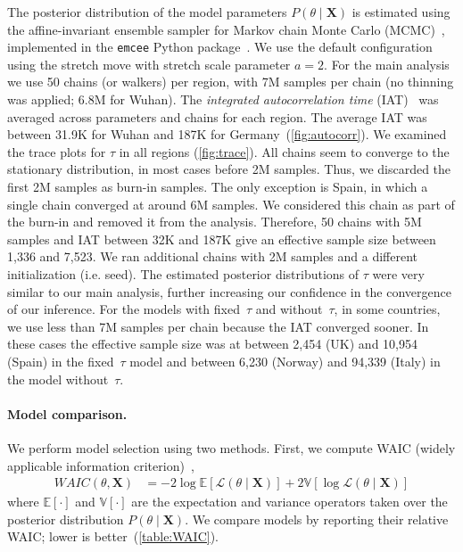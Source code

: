 \documentclass[12pt]{extarticle}
\let\vec\mathbf
\begin{document}
{The posterior distribution of the model parameters $P(\theta \mid \vec{X})$ is estimated using the affine-invariant ensemble sampler for Markov chain Monte Carlo (MCMC)~\citep{Goodman2010}, implemented in the \texttt{emcee} Python package~\citep{Foreman-Mackey2013}.
We use the default configuration using the stretch move with stretch scale parameter $a=2$.
For the main analysis we use 50 chains (or walkers) per region, with 7M samples per chain (no thinning was applied; 6.8M for Wuhan).
The \emph{integrated autocorrelation time} (IAT)~\citep{Foreman-Mackey2013,Goodman2010} was averaged across parameters and chains for each region. 
The average IAT was between 31.9K for Wuhan and 187K for Germany~(\autoref{fig:autocorr}).
We examined the trace plots for $\tau$ in all regions (\autoref{fig:trace}).
All chains seem to converge to the stationary distribution, in most cases before 2M samples. Thus, we discarded the first 2M samples as burn-in samples.
The only exception is Spain, in which a single chain converged at around 6M samples.
We considered this chain as part of the burn-in and removed it from the analysis.
Therefore, 50 chains with 5M samples and IAT between 32K and 187K give an effective sample size between 1,336 and 7,523.
We ran additional chains with 2M samples and a different initialization (i.e. seed). The estimated posterior distributions of $\tau$ were very similar to our main analysis, further increasing our confidence in the convergence of our inference.
For the models with fixed~$\tau$ and without~$\tau$, in some countries, we use less than 7M samples per chain because the IAT converged sooner.
In these cases the effective sample size was at between 2,454 (UK) and 10,954 (Spain) in the fixed~$\tau$ model and between 6,230 (Norway) and 94,339 (Italy) in the model without~$\tau$.



\paragraph*{Model comparison.}
We perform model selection using two methods.
First, we compute WAIC (widely applicable information criterion)~\citep{gelman2013bayesian},
\begin{equation} \label{eq:WAIC}
\begin{aligned}
\mathit{WAIC}(\theta, \vec{X}) &= -2\log\mathbb{E}[\mathcal{L}(\theta \mid \vec{X})] + 2\mathbb{V}[\log\mathcal{L}(\theta \mid \vec{X})]
\end{aligned}
\end{equation}
where $\mathbb{E}[\cdot]$ and $\mathbb{V}[\cdot]$ are the expectation and variance operators taken over the posterior distribution $P(\theta \mid \vec{X})$.
We compare models by reporting their relative WAIC; lower is better~(\autoref{table:WAIC}).

}
\end{document}
